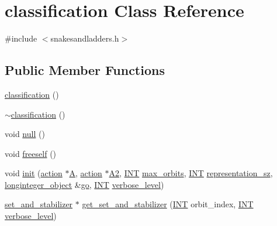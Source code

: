 \hypertarget{classclassification}{}\section{classification Class Reference}
\label{classclassification}


{\ttfamily \#include $<$snakesandladders.\+h$>$}

\subsection*{Public Member Functions}
\begin{DoxyCompactItemize}
\item 
\mbox{\hyperlink{classclassification_a96cfefed3bbc9b8b61a44b9c6cc9e29a}{classification}} ()
\item 
\mbox{\hyperlink{classclassification_ac65a474682b7c3b8661585de8b8f8f8b}{$\sim$classification}} ()
\item 
void \mbox{\hyperlink{classclassification_a9489c0ef3287fa50dca8c925217105b2}{null}} ()
\item 
void \mbox{\hyperlink{classclassification_ae3e04d2bc896aaf61cda2d5501407225}{freeself}} ()
\item 
void \mbox{\hyperlink{classclassification_ac299170ae2796ee29a2a509ec0641125}{init}} (\mbox{\hyperlink{classaction}{action}} $\ast$\mbox{\hyperlink{classclassification_a3b0380ab416e2a8fbde7d39e9503a0bb}{A}}, \mbox{\hyperlink{classaction}{action}} $\ast$\mbox{\hyperlink{classclassification_a756909effb5b0b01b3f389205a4bc05a}{A2}}, \mbox{\hyperlink{galois_8h_a09fddde158a3a20bd2dcadb609de11dc}{I\+NT}} \mbox{\hyperlink{classclassification_a314ef47e657051262f3f48e1819033a3}{max\+\_\+orbits}}, \mbox{\hyperlink{galois_8h_a09fddde158a3a20bd2dcadb609de11dc}{I\+NT}} \mbox{\hyperlink{classclassification_a8d9b1c855773249f932579c6b6ad4f03}{representation\+\_\+sz}}, \mbox{\hyperlink{classlonginteger__object}{longinteger\+\_\+object}} \&\mbox{\hyperlink{classclassification_a386d68ab8ebe2cb336997d0d44711896}{go}}, \mbox{\hyperlink{galois_8h_a09fddde158a3a20bd2dcadb609de11dc}{I\+NT}} \mbox{\hyperlink{simeon_8_c_a818073fbcc2f439e7c56952f67386122}{verbose\+\_\+level}})
\item 
\mbox{\hyperlink{classset__and__stabilizer}{set\+\_\+and\+\_\+stabilizer}} $\ast$ \mbox{\hyperlink{classclassification_a1ab1ff0514a305dc9686448919598e87}{get\+\_\+set\+\_\+and\+\_\+stabilizer}} (\mbox{\hyperlink{galois_8h_a09fddde158a3a20bd2dcadb609de11dc}{I\+NT}} orbit\+\_\+index, \mbox{\hyperlink{galois_8h_a09fddde158a3a20bd2dcadb609de11dc}{I\+NT}} \mbox{\hyperlink{simeon_8_c_a818073fbcc2f439e7c56952f67386122}{verbose\+\_\+level}})

\end{DoxyCompactItemize}
